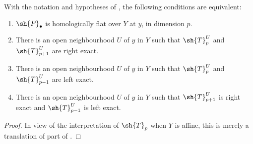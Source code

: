 \begin{proposition}[7.8.3]
\label{III.7.8.3}
With the notation and hypotheses of , the
following conditions are equivalent:
\begin{enumerate}
  \item[a)] $\sh{P}_\bullet$ is homologically flat over $Y$
  at $y$, in dimension $p$.
  \item[b)] There is an open neighbourhood $U$ of $y$ in
  $Y$ such that $\sh{T}_p^U$ and $\sh{T}_{p+1}^U$ are right
  exact.
  \item[c)] There is an open neighbourhood $U$ of $y$ in
  $Y$ such that $\sh{T}_p^U$ and $\sh{T}_{p-1}^U$ are left
  exact.
  \item[d)] There is an open neighbourhood $U$ of $y$ in
  $Y$ such that $\sh{T}_{p+1}^U$ is right exact and
  $\sh{T}_{p-1}^U$ is left exact.
\end{enumerate}
\end{proposition}

\begin{proof}
In view of the interpretation of $\sh{T}_p$ when $Y$ is
affine, this is merely a translation of part of
.
\end{proof}

